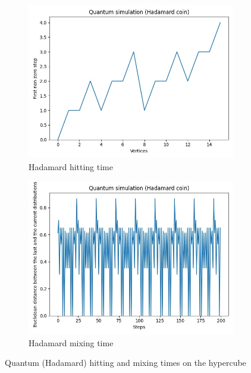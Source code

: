 \begin{figure}[H]
  \centering
  \begin{subfigure}{.45\linewidth}
    \centering
    \includegraphics[width=\linewidth]{./figures/results/hypercube/hadamard_hitting_time.jpg}
    \caption{Hadamard hitting time}
  \end{subfigure}
  \begin{subfigure}{.45\linewidth}
    \centering
    \includegraphics[width=\linewidth]{./figures/results/hypercube/hadamard_mixing_time.jpg}
    \caption{Hadamard mixing time}
  \end{subfigure}
  \caption{Quantum (Hadamard) hitting and mixing times on the hypercube}
\end{figure}

